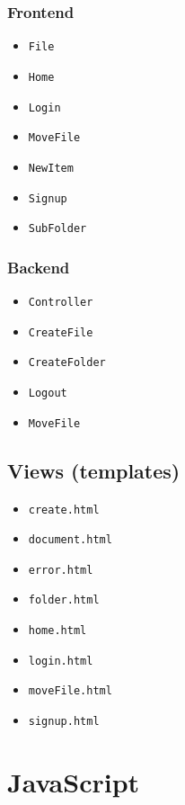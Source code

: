 \documentclass[a4paper, dvipsnames]{article}
\begin{document}
\begin{multicols}{2}
		\subsubsection{Frontend}
		\begin{itemize}
			\item \verb|File|
			\item \verb|Home|
			\item \verb|Login|
			\item \verb|MoveFile|
			\item \verb|NewItem|
			\item \verb|Signup|
			\item \verb|SubFolder|
		\end{itemize}
		
		\columnbreak
		
		\subsubsection{Backend}
		\begin{itemize}
			\item \verb|Controller|
			\item \verb|CreateFile|
			\item \verb|CreateFolder|
			\item \verb|Logout|
			\item \verb|MoveFile|
		\end{itemize}
	
		\subsection{Views (templates)}
		\begin{itemize}
			\item \verb|create.html|
			\item \verb|document.html|
			\item \verb|error.html|
			\item \verb|folder.html|
			\item \verb|home.html|
			\item \verb|login.html|
			\item \verb|moveFile.html|
			\item \verb|signup.html|
		\end{itemize}
		\vfill\null
	\end{multicols}
	
	\pagebreak
	
	\section{JavaScript}
	
\end{document}
